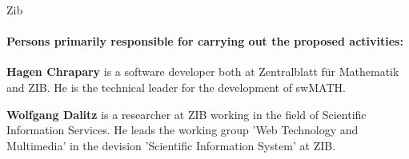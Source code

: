 \begin{sitedescription}{Zib}





\paragraph*{Persons primarily responsible for carrying out the proposed activities:}

\begin{compactitem} %

\item{\bf Hagen Chrapary} is a  software developer both at Zentralblatt für Mathematik and ZIB. He is the technical leader for the development of swMATH. 
\item{\bf Wolfgang Dalitz} is a  researcher at ZIB working in the field of Scientific Information Services. 
He leads the working group 'Web Technology and Multimedia' in the devision 'Scientific Information System' at ZIB.

\end{compactitem}

\end{sitedescription}

